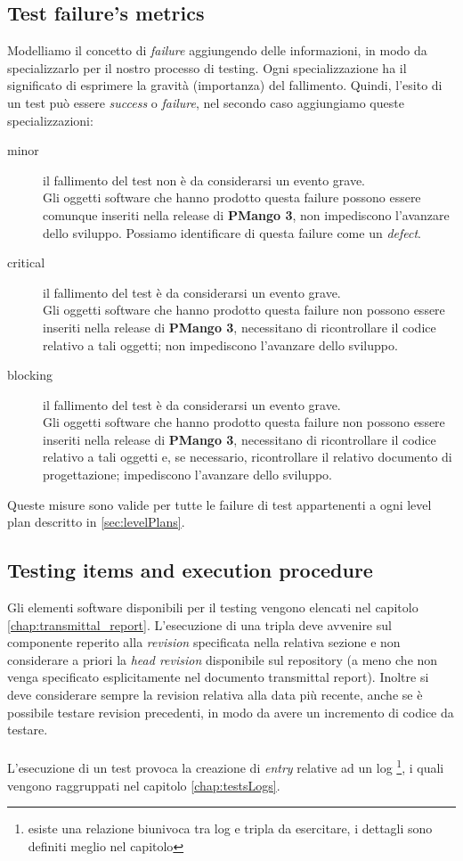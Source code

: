 \subsection{Test failure's metrics}
Modelliamo il concetto di \emph{failure} aggiungendo delle informazioni, in
modo da specializzarlo per il nostro processo di testing. Ogni
specializzazione ha il significato di esprimere la gravit\`a (importanza) del
fallimento. Quindi, l'esito di un test pu\`o essere \emph{success} o
\emph{failure}, nel secondo caso aggiungiamo queste specializzazioni:
\begin{description}
  \item[minor] il fallimento del test non \`e da considerarsi un evento grave.\\
  Gli oggetti software che hanno prodotto questa failure possono essere comunque
  inseriti nella release di \textbf{PMango 3}, non impediscono l'avanzare dello
  sviluppo. Possiamo identificare di questa failure come un \emph{defect}.
  \item[critical] il fallimento del test \`e da considerarsi un evento grave.\\
  Gli oggetti software che hanno prodotto questa failure non possono essere
  inseriti nella release di \textbf{PMango 3}, necessitano di ricontrollare il
  codice relativo a tali oggetti; non impediscono l'avanzare dello sviluppo.
  \item[blocking] il fallimento del test \`e da considerarsi un evento grave.\\
  Gli oggetti software che hanno prodotto questa failure non possono essere
  inseriti nella release di \textbf{PMango 3}, necessitano di ricontrollare il
  codice relativo a tali oggetti e, se necessario, ricontrollare il relativo
  documento di progettazione; impediscono l'avanzare dello sviluppo.
\end{description}
Queste misure sono valide per tutte le failure di test appartenenti a ogni
level plan descritto in \ref{sec:levelPlans}.

\subsection{Testing items and execution procedure}
Gli elementi software disponibili per il testing vengono elencati nel
capitolo \ref{chap:transmittal_report}. L'esecuzione di una tripla deve
avvenire sul componente reperito alla \emph{revision} specificata nella
relativa sezione e non considerare a priori la \emph{head revision} disponibile
sul repository (a meno che non venga specificato esplicitamente nel documento
transmittal report). Inoltre si deve considerare sempre la revision relativa
alla data pi\`u recente, anche se \`e possibile testare revision precedenti, in
modo da avere un incremento di codice da testare.
\\ \\ 
L'esecuzione di un test provoca la creazione di \emph{entry} relative ad un log
\footnote{esiste una relazione biunivoca tra log e tripla da esercitare, i
dettagli sono definiti meglio nel capitolo}, i quali vengono
raggruppati nel capitolo \ref{chap:testsLogs}.

